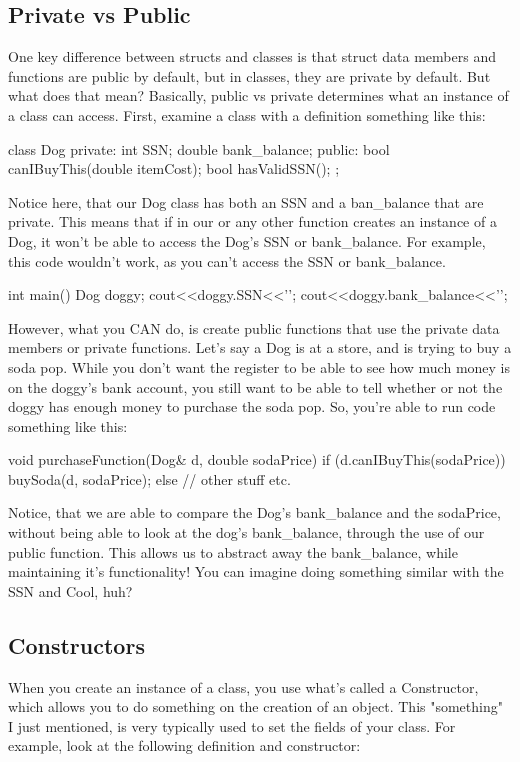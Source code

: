\documentclass{tufte-handout}
\begin{document}
\subsection{Private vs Public}
One key difference between structs and classes is that struct data members and functions are public by default, but in classes, they are private by default.
But what does that mean?
Basically, public vs private determines what an instance of a class can access.
First, examine a class with a definition something like this:
\begin{Code}
class Dog{
    private: 
        int SSN;
        double bank_balance;
    public:
        bool canIBuyThis(double itemCost);
        bool hasValidSSN();
};
\end{Code}
Notice here, that our Dog class has both an SSN and a ban\_balance that are private. 
This means that if in our  or any other function creates an instance of a Dog, it won't be able to access the Dog's SSN or bank\_balance.
For example, this code wouldn't work, as you can't access the SSN or bank\_balance.
\begin{Code}
int main(){
    Dog doggy;
    cout<<doggy.SSN<<'\n';
    cout<<doggy.bank_balance<<'\n';
}
\end{Code}
However, what you CAN do, is create public functions that use the private data members or private functions.
Let's say a Dog is at a store, and is trying to buy a soda pop.
While you don't want the register to be able to see how much money is on the doggy's bank account, you still want to be able to tell whether or not the doggy has enough money to purchase the soda pop.
So, you're able to run code something like this:
\begin{Code}
void purchaseFunction(Dog& d, double sodaPrice){
    if (d.canIBuyThis(sodaPrice)){
        buySoda(d, sodaPrice);}
    else{
        // other stuff etc. }
}
\end{Code}
Notice, that we are able to compare the Dog's bank\_balance and the sodaPrice, without being able to look at the dog's bank\_balance, through the use of our public  function.
This allows us to abstract away the bank\_balance, while maintaining it's functionality!
You can imagine doing something similar with the SSN and 
Cool, huh?

\subsection{Constructors}
When you create an instance of a class, you use what's called a Constructor, which allows you to do something on the creation of an object.
This "something" I just mentioned, is very typically used to set the fields of your class.
For example, look at the following definition and constructor:
\end{document}
